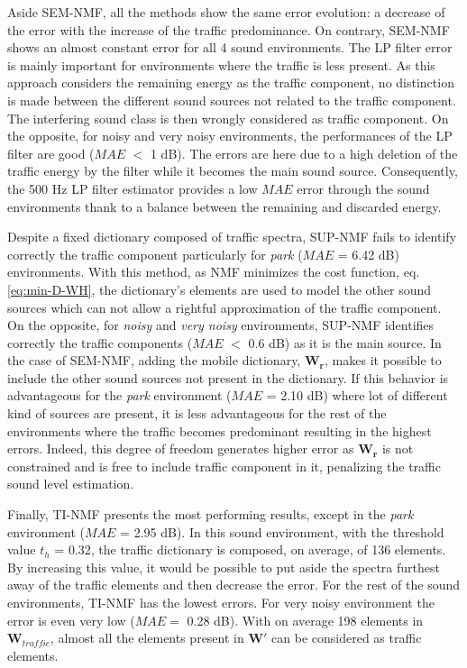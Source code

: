 \documentclass[review,5p,twocolumn,sort&compress,times]{elsarticle}
\begin{document}
Aside SEM-NMF, all the methods show the same error evolution: a decrease of the error with the increase of the traffic predominance. On contrary, SEM-NMF shows an almost constant error for all 4 sound environments. The LP filter error is mainly important for environments where the traffic is less present. As this approach considers the remaining energy as the traffic component, no distinction is made between the different sound sources not related to the traffic component. The interfering sound class is then wrongly considered as traffic component. On the opposite, for noisy and very noisy environments, the performances of the LP filter are good ($MAE$ $<$ 1 dB). The errors are here due to a high deletion of the traffic energy by the filter while it becomes the main sound source. Consequently, the 500 Hz LP filter estimator provides a low $MAE$ error through the sound environments thank to a balance between the remaining and discarded energy. 

Despite a fixed dictionary composed of traffic spectra, SUP-NMF fails to identify correctly the traffic component particularly for \textit{park} ($MAE$ = 6.42 dB) environments. With this method, as NMF minimizes the cost function, eq. \ref{eq:min-D-WH}, the dictionary's elements are used to model the other sound sources which can not allow a rightful approximation of the traffic component. On the opposite, for \textit{noisy} and \textit{very noisy} environments, SUP-NMF identifies correctly the traffic components ($MAE$ $<$ 0.6 dB) as it is the main source.
In the case of SEM-NMF, adding the mobile dictionary, $\mathbf{W_r}$, makes it possible to include the other sound sources not present in the dictionary. If this behavior is advantageous for the \textit{park} environment ($MAE$ = 2.10 dB) where lot of different kind of sources are present, it is less advantageous for the rest of the environments where the traffic becomes predominant resulting in the highest errors. Indeed, this degree of freedom generates higher error as $\mathbf{W_r}$ is not constrained and is free to include traffic component in it, penalizing the traffic sound level estimation.

Finally, TI-NMF presents the most performing results, except in the \textit{park} environment ($MAE$ = 2.95 dB). In this sound environment, with the threshold value $t_h$ = 0.32, the traffic dictionary is composed, on average, of 136 elements.
By increasing this value, it would be possible to put aside the spectra furthest away of the traffic elements and then decrease the error. For the rest of the sound environments, TI-NMF has the lowest errors. For very noisy environment the error is even very low ($MAE=$ 0.28 dB). With on average 198 elements in $\mathbf{W}_{traffic}$, almost all the elements present in $\mathbf{W'}$ can be considered as traffic elements. 
\end{document}
